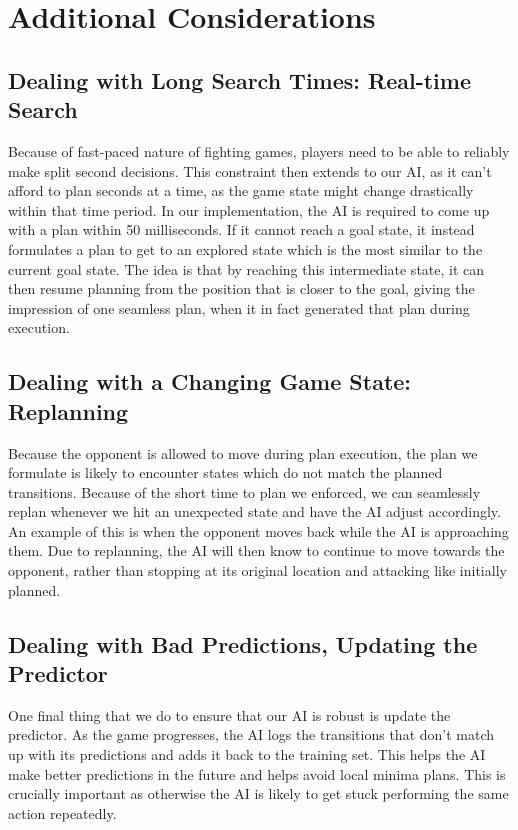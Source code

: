 \section{Additional Considerations}

\subsection{Dealing with Long Search Times: Real-time Search}
Because of fast-paced nature of fighting games, players need to be able to reliably make split second decisions. This constraint then extends to our AI, as it can't afford to plan seconds at a time, as the game state might change drastically within that time period. In our implementation, the AI is required to come up with a plan within 50 milliseconds. If it cannot reach a goal state, it instead formulates a plan to get to an explored state which is the most similar to the current goal state. The idea is that by reaching this intermediate state, it can then resume planning from the position that is closer to the goal, giving the impression of one seamless plan, when it in fact generated that plan during execution.


\subsection{Dealing with a Changing Game State: Replanning}
Because the opponent is allowed to move during plan execution, the plan we formulate is likely to encounter states which do not match the planned transitions. Because of the short time to plan we enforced, we can seamlessly replan whenever we hit an unexpected state and have the AI adjust accordingly. An example of this is when the opponent moves back while the AI is approaching them. Due to replanning, the AI will then know to continue to move towards the opponent, rather than stopping at its original location and attacking like initially planned.


\subsection{Dealing with Bad Predictions, Updating the Predictor}
One final thing that we do to ensure that our AI is robust is update the predictor. As the game progresses, the AI logs the transitions that don't match up with its predictions and adds it back to the training set. This helps the AI make better predictions in the future and helps avoid local minima plans. This is crucially important as otherwise the AI is likely to get stuck performing the same action repeatedly.


